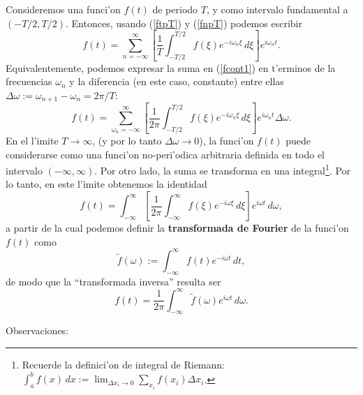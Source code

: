 Consideremos una funci'on $f(t)$ de periodo $T$, y como intervalo fundamental a $(-T/2,T/2)$. Entonces, usando (\ref{ftpT}) y (\ref{fnpT}) podemos escribir
\begin{equation}\label{fcont1}
f(t) =\sum_{n = -\infty}^\infty\left[\frac{1}{T}\int_{-T/2}^{T/2} f(\xi) e^{-i\omega_n\xi}\, d\xi\right] e^{i\omega_nt}.
\end{equation}
Equivalentemente, podemos expresar la suma en (\ref{fcont1}) en t'erminos de la frecuencias $\omega_n$ y la diferencia (en este caso, constante) entre ellas $\Delta\omega:=\omega_{n+1}-\omega_n=2\pi/T$:
\begin{equation}
f(t) =\sum_{\omega_n = -\infty}^\infty\left[\frac{1}{2\pi}
\int_{-T/2}^{T/2} f(\xi) e^{-i\omega_n\xi}\,d\xi\right] e^{i\omega_n t}\Delta\omega.
\end{equation}
En el l'imite $T\to\infty$, (y por lo tanto $\Delta\omega\to 0$), la funci'on $f(t)$ puede considerarse como una funci'on no-peri'odica arbitraria definida en todo el intervalo $(-\infty,\infty)$. Por otro lado, la suma se transforma en una integral\footnote{Recuerde la definici'on de integral de Riemann: $\int_a^bf(x)\,dx:=\lim_{\Delta x_i\to 0}\sum_{x_i}f(x_i)\Delta x_i$.}. Por lo tanto, en este l'imite obtenemos la identidad
\begin{equation}\label{idfnp}
f(t) =\int_{-\infty}^\infty\left[\frac{1}{2\pi}\int_{-\infty}^\infty
 f(\xi) e^{-i\omega\xi}\,d\xi\right] e^{i\omega t}\,d\omega,
\end{equation}
a partir de la cual podemos definir la \textbf{transformada de Fourier} de la funci'on $f(t)$ como
\begin{equation}\label{TFf}
\boxed{\tilde{f}(\omega) :=\int_{-\infty}^\infty f(t) e^{-i\omega t}\,dt,}
\end{equation}
de modo que la ``transformada inversa'' resulta ser
\begin{equation}\label{TFIf}
\boxed{f(t)=\frac{1}{2\pi}\int_{-\infty}^\infty\tilde{f}(\omega) e^{i\omega t} \,d\omega.}
\end{equation}



Observaciones:

